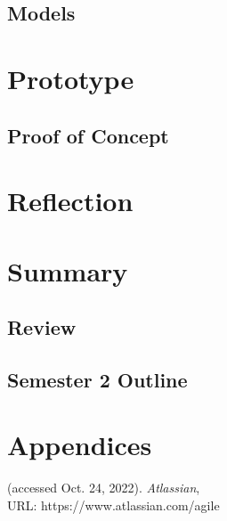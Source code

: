 \documentclass{article}
\begin{document}
\subsection{Models}



\section{Prototype}



\subsection{Proof of Concept}



\section{Reflection}



\section{Summary}



\subsection{Review}



\subsection{Semester 2 Outline}



\section{Appendices}





\clearpage
\begin{thebibliography}{9}


(accessed Oct. 24, 2022). 
\emph{Atlassian}, \\URL: https://www.atlassian.com/agile 



\end{thebibliography}
\end{document}
